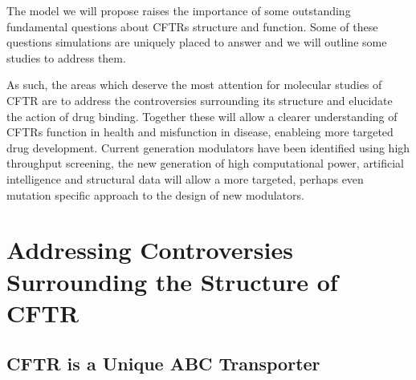 The model we will propose raises the importance of some outstanding fundamental questions about CFTRs structure and function. Some of these questions simulations are uniquely placed to answer and we will outline some studies to address them. 

As such, the areas which deserve the most attention for molecular studies of CFTR are to address the controversies surrounding its structure and elucidate the action of drug binding. Together these will allow a clearer understanding of CFTRs function in health and misfunction in disease, enableing more targeted drug development. Current generation modulators have been identified using high throughput screening, the new generation of high computational power, artificial intelligence and structural data will allow a more targeted, perhaps even mutation specific approach to the design of new modulators.

\section{Addressing Controversies Surrounding the Structure of CFTR}

\subsection{CFTR is a Unique ABC Transporter}


